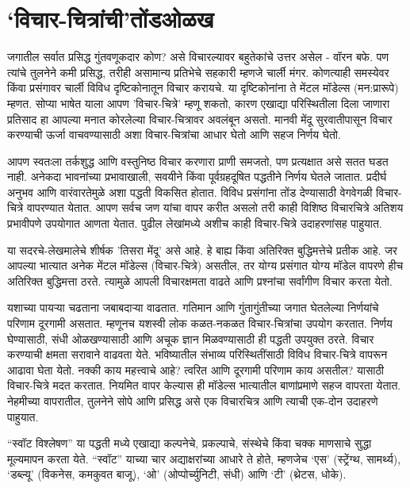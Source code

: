 \chapter{‘विचार-चित्रांची’तोंडओळख}

जगातील सर्वात प्रसिद्ध गुंतवणूकदार कोण? असे विचारल्यावर बहुतेकांचे उत्तर असेल - वॉरन बफे. पण त्यांचे तुलनेने कमी प्रसिद्ध, तरीही असामान्य प्रतिभेचे सहकारी म्हणजे चार्ली मंगर. कोणत्याही समस्येवर किंवा प्रसंगावर चार्ली विविध दृष्टिकोनातून विचार करायचे. या दृष्टिकोनांना ते मेंटल मॉडेल्स (मन:प्रारूपे) म्हणत. सोप्या भाषेत याला आपण 'विचार-चित्रे' म्हणू शकतो, कारण एखाद्या परिस्थितीला दिला जाणारा प्रतिसाद हा आपल्या मनात कोरलेल्या विचार-चित्रावर अवलंबून असतो. मानवी मेंदू सुरवातीपासून  विचार करण्याची ऊर्जा वाचवण्यासाठी अशा विचार-चित्रांचा आधार घेतो आणि सहज निर्णय घेतो.

आपण स्वतःला तर्कशुद्ध आणि वस्तुनिष्ठ विचार करणारा प्राणी समजतो, पण प्रत्यक्षात असे सतत घडत नाही. अनेकदा भावनांच्या प्रभावाखाली, सवयीने किंवा पूर्वग्रहदूषित पद्धतीने निर्णय घेतले जातात. प्रदीर्घ अनुभव आणि वारंवारतेमुळे अशा पद्धती विकसित होतात. विविध प्रसंगांना तोंड देण्यासाठी वेगवेगळी विचार-चित्रे वापरण्यात येतात. आपण सर्वच जण यांचा वापर करीत असलो तरी काही विशिष्ठ विचारचित्रे अतिशय प्रभावीपणे उपयोगात आणता येतात. पुढील लेखांमध्ये अशीच काही विचार-चित्रे उदाहरणांसह पाहुयात.

या सदरचे-लेखमालेचे शीर्षक 'तिसरा मेंदू' असे आहे. हे बाह्य किंवा अतिरिक्त बुद्धिमत्तेचे प्रतीक आहे. जर आपल्या भात्यात अनेक मेंटल मॉडेल्स (विचार-चित्रे) असतील, तर योग्य प्रसंगात योग्य मॉडेल वापरणे हीच अतिरिक्त बुद्धिमत्ता ठरते. त्यामुळे आपली विचारक्षमता वाढते आणि प्रश्नांचा सर्वांगीण विचार करता येतो.

यशाच्या पायऱ्या चढताना जबाबदाऱ्या वाढतात. गतिमान आणि गुंतागुंतीच्या जगात घेतलेल्या निर्णयांचे परिणाम दूरगामी असतात. म्हणूनच यशस्वी लोक कळत-नकळत विचार-चित्रांचा उपयोग करतात. निर्णय घेण्यासाठी, संधी ओळखण्यासाठी आणि अचूक ज्ञान मिळवण्यासाठी ही पद्धती उपयुक्त ठरते. विचार करण्याची क्षमता सरावाने वाढवता येते. भविष्यातील संभाव्य परिस्थितींसाठी विविध विचार-चित्रे वापरून आढावा घेता येतो. नक्की काय महत्त्वाचे आहे? त्वरित आणि दूरगामी परिणाम काय असतील? यासाठी विचार-चित्रे मदत करतात. नियमित वापर केल्यास ही मॉडेल्स भात्यातील बाणांप्रमाणे सहज वापरता येतात. नेहमीच्या वापरातील, तुलनेने सोपे आणि प्रसिद्ध असे एक विचारचित्र आणि त्याची एक-दोन उदाहरणे पाहुयात. 

“स्वॉट विश्लेषण” 
या पद्धती मध्ये एखाद्या कल्पनेचे, प्रकल्पाचे, संस्थेचे किंवा चक्क माणसाचे सुद्धा मूल्यमापन करता येते. “स्वॉट” याच्या चार अद्याक्षरांच्या आधारे ते होते, म्हणजेच ‘एस’ (स्ट्रेंग्थ, सामर्थ्य), ‘डब्ल्यू’ (विकनेस, कमकुवत बाजू), ‘ओ’ (ओप्पोर्च्युनिटी, संधी) आणि ‘टी’ (थ्रेटस, धोके). 

